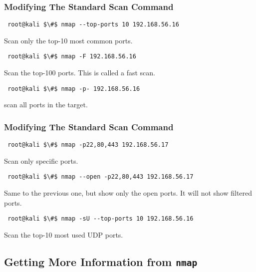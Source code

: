 \documentclass[aspectratio=169,xcolor=dvipsnames]{beamer}
\begin{document}
\begin{frame}[fragile]
    \frametitle{Modifying The Standard Scan Command}

    \begin{lstlisting}
 root@kali $\#$ nmap --top-ports 10 192.168.56.16
    \end{lstlisting}

    Scan only the top-10 most common ports.

    \pause

    \begin{lstlisting}
 root@kali $\#$ nmap -F 192.168.56.16
    \end{lstlisting}

    Scan the top-100 ports. This is called a fast scan.

    \pause

    \begin{lstlisting}
 root@kali $\#$ nmap -p- 192.168.56.16
    \end{lstlisting}

    scan all ports in the target.

\end{frame}

\begin{frame}[fragile]
    \frametitle{Modifying The Standard Scan Command}

    \begin{lstlisting}
 root@kali $\#$ nmap -p22,80,443 192.168.56.17
    \end{lstlisting}

    Scan only specific ports.

    \pause

    \begin{lstlisting}
 root@kali $\#$ nmap --open -p22,80,443 192.168.56.17
    \end{lstlisting}

    Same to the previous one, but show only the open ports. It will not show filtered ports.

    \pause

    \begin{lstlisting}
 root@kali $\#$ nmap -sU --top-ports 10 192.168.56.16
    \end{lstlisting}

    Scan the top-10 most used UDP ports.

\end{frame}

\subsection{Getting More Information from \texttt{nmap}}
\end{document}
